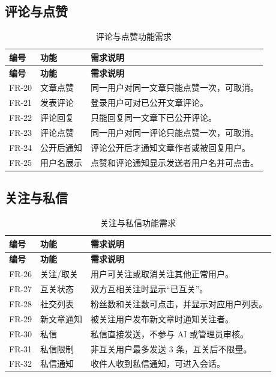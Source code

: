 \documentclass[UTF8,a4paper,12pt]{ctexart}
\begin{document}
\subsection{评论与点赞}

\begin{longtable}{>{\centering\arraybackslash}p{2.1cm}p{3.3cm}p{8.6cm}}
\caption{评论与点赞功能需求}\\
\toprule
\rowcolor{tablehead}\textbf{编号} & \textbf{功能} & \textbf{需求说明}\\
\midrule
\endfirsthead
\toprule
\rowcolor{tablehead}\textbf{编号} & \textbf{功能} & \textbf{需求说明}\\
\midrule
\endhead
FR-20 & 文章点赞 & 同一用户对同一文章只能点赞一次，可取消。\\
FR-21 & 发表评论 & 登录用户可对已公开文章评论。\\
FR-22 & 评论回复 & 只能回复同一文章下已公开评论。\\
FR-23 & 评论点赞 & 同一用户对同一评论只能点赞一次，可取消。\\
FR-24 & 公开后通知 & 评论公开后才通知文章作者或被回复用户。\\
FR-25 & 用户名展示 & 点赞和评论通知显示发送者用户名并可点击。\\
\bottomrule
\end{longtable}

\subsection{关注与私信}

\begin{longtable}{>{\centering\arraybackslash}p{2.1cm}p{3.3cm}p{8.6cm}}
\caption{关注与私信功能需求}\\
\toprule
\rowcolor{tablehead}\textbf{编号} & \textbf{功能} & \textbf{需求说明}\\
\midrule
\endfirsthead
\toprule
\rowcolor{tablehead}\textbf{编号} & \textbf{功能} & \textbf{需求说明}\\
\midrule
\endhead
FR-26 & 关注/取关 & 用户可关注或取消关注其他正常用户。\\
FR-27 & 互关状态 & 双方互相关注时显示“已互关”。\\
FR-28 & 社交列表 & 粉丝数和关注数可点击，并显示对应用户列表。\\
FR-29 & 新文章通知 & 被关注用户发布新文章时通知关注者。\\
FR-30 & 私信 & 私信直接发送，不参与 AI 或管理员审核。\\
FR-31 & 私信限制 & 非互关用户最多发送 3 条，互关后不限量。\\
FR-32 & 私信通知 & 收件人收到私信通知，可进入会话。\\
\bottomrule
\end{longtable}
\end{document}
